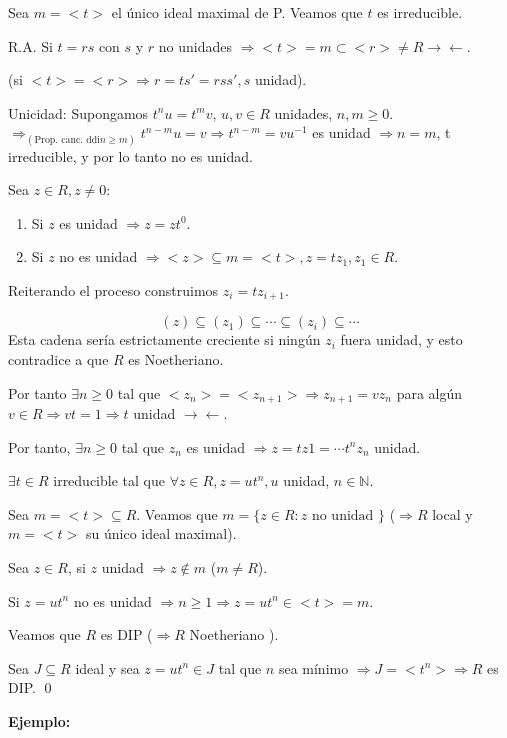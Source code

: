 \begin{Dem}
 Sea $m=<t>$ el único ideal maximal de P. Veamos que $t$ es irreducible. 

R.A. Si $t=rs$ con $s$ y $r$ no unidades $\Rightarrow <t>=m\subset <r> \neq R \rightarrow \leftarrow$.

(si $<t>=<r> \Rightarrow r=ts'=rss', s$ unidad).

Unicidad: Supongamos $t^nu=t^mv$, $u,v\in R$ unidades, $n,m\ge 0$. $\Rightarrow_{(\text{Prop. canc. ddi}n\ge m)}t^{n-m}u=v \Rightarrow t^{n-m}=vu^{-1}$ es unidad $\Rightarrow n=m$, t irreducible, y por lo tanto no es unidad.

Sea $z\in R,z\neq 0$:
\begin{enumerate}
\item Si $z$ es unidad $\Rightarrow z=zt^0$.
\item Si $z$ no es unidad $\Rightarrow <z>\subseteq m=<t>, z=tz_1,z_1\in R$.
\end{enumerate}
Reiterando el proceso construimos $z_{i}=tz_{i+1}$. 

$$(z)\subseteq (z_1)\subseteq \cdots \subseteq (z_i)\subseteq \cdots$$
Esta cadena sería estrictamente creciente si ningún $z_i$ fuera unidad, y esto contradice a que $R$ es Noetheriano. 

Por tanto $\exists n  \ge 0$ tal que $<z_n>=<z_{n+1}>\Rightarrow z_{n+1}=vz_n$ para algún $v\in R \Rightarrow vt=1 \Rightarrow t$ unidad $\rightarrow \leftarrow$.

Por tanto, $\exists n \ge 0$ tal que $z_n$ es unidad $\Rightarrow z=tz1=\cdots t^nz_n$ unidad.  

 $\exists t \in R$ irreducible tal que $\forall z \in R, z=ut^n, u$ unidad, $n\in \mathbb{N}$. 

Sea $m=<t>\subseteq R$. Veamos que $m=\{z\in R : z\text{ no unidad }\}$ ($\Rightarrow R$ local y $m=<t>$ su único ideal maximal).

Sea $z\in R$, si $z$ unidad $\Rightarrow z \notin m$ ($m\neq R$).

Si $z=ut^n$ no es unidad $\Rightarrow n\ge 1 \Rightarrow z=ut^n\in <t>=m$. 

Veamos que $R$ es DIP ($\Rightarrow R$ Noetheriano ). 

Sea $J\subseteq R$ ideal y sea $z=ut^n \in J$ tal que $n$ sea mínimo $\Rightarrow J=<t^n> \Rightarrow R $ es DIP. \qed
\end{Dem}

\textbf{Ejemplo: }

